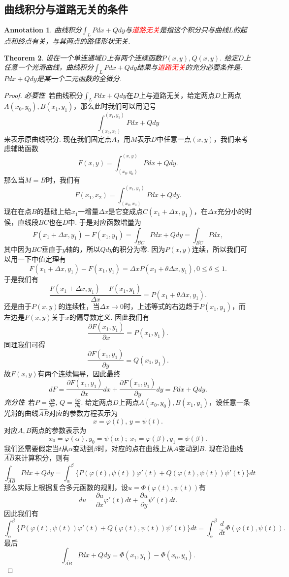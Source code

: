 \documentclass{article}
\newtheorem{theorem}{Theorem}[section]
\newtheorem{annotation}[theorem]{Annotation}
\newcommand{\redt}[1]{\textcolor{red}{#1}}
\begin{document}
\newpage
\subsection{曲线积分与道路无关的条件}

\begin{annotation}
\rm 曲线积分$\int_L Pdx + Qdy$与\redt{道路无关}是指这个积分只与曲线$L$的起点和终点有关，与其两点的路径形状无关. 
\end{annotation}

\begin{theorem}\label{line-integral: path-independent}
\rm 设在一个单连通域$D$上有两个连续函数$P(x,y),Q(x,y)$. 给定$D$上任意一个光滑曲线，曲线积分$\int_L Pdx + Qdy$结果与\redt{道路无关}的充分必要条件是: $Pdx+Qdy$是某一个二元函数的全微分. 
\end{theorem}

\begin{proof}
\rm \emph{必要性}\ 若曲线积分$\int_L Pdx + Qdy$在$D$上与道路无关，给定两点$D$上两点$A(x_0,y_0),B(x_1,y_1)$，那么此时我们可以用记号
$$
\int_{(x_0,x_0)}^{(x_1,y_1)} Pdx+Qdy
$$
来表示原曲线积分. 现在我们固定点$A$，用$M$表示$D$中任意一点$(x,y)$，我们来考虑辅助函数
$$
F(x,y) = \int_{(x_0,y_0)}^{(x,y)} Pdx+Qdy.
$$
那么当$M=B$时，我们有
$$
F(x_1,x_2) = \int_{(x_0,x_0)}^{(x_1,y_1)} Pdx+Qdy.
$$
现在在点$B$的基础上给$x_1$一增量$\Delta x$是它变成点$C(x_1+\Delta x,y_1)$，在$\Delta x$充分小的时候，直线段$BC$也在$D$中. 于是对应函数增量为
$$
F(x_1+\Delta x ,y_1)-F(x_1,y_1) = \int_{\overline{BC}}Pdx+ Qdy = \int_{\overline{BC}} Pdx,
$$ 
其中因为$BC$垂直于$y$轴的，所以$Qdy$的积分为零. 因为$P(x,y)$连续，所以我们可以用一下中值定理有
$$
F(x_1+\Delta x ,y_1)-F(x_1,y_1) = \Delta x P(x_1+\theta \Delta x,y_1),  0 \leq \theta \leq 1.
$$
于是我们有
$$
\frac{F(x_1+\Delta x ,y_1)-F(x_1,y_1)}{\Delta x} = P(x_1+\theta \Delta x, y_1).
$$
还是由于$P(x,y)$的连续性，当$\Delta x \to 0$时，上述等式的右边趋于$P(x_1,y_1)$，而左边是$F(x,y)$关于$x$的偏导数定义. 因此我们有
$$
\frac{\partial F(x_1,y_1)}{\partial x} = P(x_1,y_1). 
$$
同理我们可得
$$
\frac{\partial F(x_1,y_1)}{\partial y} = Q(x_1,y_1). 
$$
故$F(x,y)$有两个连续偏导，因此最终
$$
dF = \frac{\partial F(x_1,y_1)}{\partial x}dx + \frac{\partial F(x_1,y_1)}{\partial y}dy = Pdx +Qdy.
$$
\emph{充分性}\ 若$P=\frac{\partial \Phi}{\partial x},\,Q=\frac{\partial \Phi}{\partial y}$. 给定两点$D$上两点$A(x_0,y_0),B(x_1,y_1)$，设任意一条光滑的曲线$\widehat{AB}$对应的参数方程表示为
$$
x = \varphi(t),\, y = \psi(t).
$$
对应$A,B$两点的参数表示为
$$
x_0 = \varphi(\alpha),y_0 =\psi(\alpha);\; x_1 =\varphi(\beta), y_1 = \psi(\beta).
$$
我们还需要假定当$t$从$\alpha$变动到$\beta$时，对应的点在曲线上从$A$变动到$B$. 现在沿曲线$\widehat{AB}$来计算积分，则有
$$
\int_{\widehat{AB}}Pdx+ Qdy = \int_\alpha^\beta \{P(\varphi(t),\psi(t))\varphi'(t) + Q(\varphi(t),\psi(t))\psi'(t)\}dt
$$
那么实际上根据复合多元函数的规则，设$u = \Phi(\varphi(t),\psi(t)) $有
$$
du = \frac{\partial u}{\partial x}\varphi'(t)dt + \frac{\partial u}{\partial y}\psi'(t)dt.
$$
因此我们有
$$
\int_\alpha^\beta \{P(\varphi(t),\psi(t))\varphi'(t) + Q(\varphi(t),\psi(t))\psi'(t)\}dt = \int_\alpha^\beta \frac{d}{dt} \Phi(\varphi(t),\psi(t)).
$$
最后
$$
\int_{\widehat{AB}}Pdx+ Qdy = \Phi(x_1,y_1)-\Phi(x_0,y_0). 
$$
\end{proof}
\end{document}
